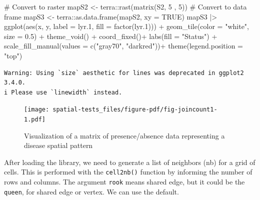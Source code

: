 \documentclass[
  letterpaper,
]{book}
\newenvironment{Shaded}{\begin{snugshade}}{\end{snugshade}}
\newcommand{\AttributeTok}[1]{\textcolor[rgb]{0.40,0.45,0.13}{#1}}
\newcommand{\CommentTok}[1]{\textcolor[rgb]{0.37,0.37,0.37}{#1}}
\newcommand{\ConstantTok}[1]{\textcolor[rgb]{0.56,0.35,0.01}{#1}}
\newcommand{\DecValTok}[1]{\textcolor[rgb]{0.68,0.00,0.00}{#1}}
\newcommand{\FloatTok}[1]{\textcolor[rgb]{0.68,0.00,0.00}{#1}}
\newcommand{\FunctionTok}[1]{\textcolor[rgb]{0.28,0.35,0.67}{#1}}
\newcommand{\NormalTok}[1]{\textcolor[rgb]{0.00,0.23,0.31}{#1}}
\newcommand{\OtherTok}[1]{\textcolor[rgb]{0.00,0.23,0.31}{#1}}
\newcommand{\SpecialCharTok}[1]{\textcolor[rgb]{0.37,0.37,0.37}{#1}}
\newcommand{\StringTok}[1]{\textcolor[rgb]{0.13,0.47,0.30}{#1}}
\begin{document}
\begin{Shaded}
\begin{Highlighting}[]
\CommentTok{\# Convert to raster }
\NormalTok{mapS2 }\OtherTok{\textless{}{-}}\NormalTok{ terra}\SpecialCharTok{::}\FunctionTok{rast}\NormalTok{(}\FunctionTok{matrix}\NormalTok{(S2, }\DecValTok{5}\NormalTok{ , }\DecValTok{5}\NormalTok{))}
\CommentTok{\# Convert to data frame}
\NormalTok{mapS3 }\OtherTok{\textless{}{-}}\NormalTok{ terra}\SpecialCharTok{::}\FunctionTok{as.data.frame}\NormalTok{(mapS2, }\AttributeTok{xy =} \ConstantTok{TRUE}\NormalTok{)}
\NormalTok{mapS3 }\SpecialCharTok{|\textgreater{}}
  \FunctionTok{ggplot}\NormalTok{(}\FunctionTok{aes}\NormalTok{(x, y, }\AttributeTok{label =}\NormalTok{ lyr}\FloatTok{.1}\NormalTok{, }\AttributeTok{fill =} \FunctionTok{factor}\NormalTok{(lyr}\FloatTok{.1}\NormalTok{))) }\SpecialCharTok{+}
  \FunctionTok{geom\_tile}\NormalTok{(}\AttributeTok{color =} \StringTok{"white"}\NormalTok{, }\AttributeTok{size =} \FloatTok{0.5}\NormalTok{) }\SpecialCharTok{+}
  \FunctionTok{theme\_void}\NormalTok{() }\SpecialCharTok{+}
  \FunctionTok{coord\_fixed}\NormalTok{()}\SpecialCharTok{+}
  \FunctionTok{labs}\NormalTok{(}\AttributeTok{fill =} \StringTok{"Status"}\NormalTok{) }\SpecialCharTok{+}
  \FunctionTok{scale\_fill\_manual}\NormalTok{(}\AttributeTok{values =} \FunctionTok{c}\NormalTok{(}\StringTok{"gray70"}\NormalTok{, }\StringTok{"darkred"}\NormalTok{))}\SpecialCharTok{+}
  \FunctionTok{theme}\NormalTok{(}\AttributeTok{legend.position =} \StringTok{"top"}\NormalTok{)}
\end{Highlighting}
\end{Shaded}

\begin{verbatim}
Warning: Using `size` aesthetic for lines was deprecated in ggplot2 3.4.0.
i Please use `linewidth` instead.
\end{verbatim}

\begin{figure}[H]

\texttt{[image: spatial-tests\_files/figure-pdf/fig-joincount1-1.pdf]} \hfill{}

\caption{\label{fig-joincount1}Visualization of a matrix of
presence/absence data representing a disease spatial pattern}

\end{figure}

After loading the library, we need to generate a list of neighbors (nb)
for a grid of cells. This is performed with the \texttt{cell2nb()}
function by informing the number of rows and columns. The argument
\texttt{rook} means shared edge, but it could be the \texttt{queen}, for
shared edge or vertex. We can use the default.
\end{document}
